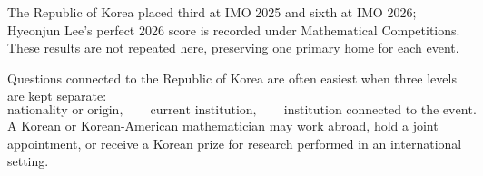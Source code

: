     \begin{fact}
        The Republic of Korea placed third at IMO 2025 and sixth at IMO 2026;
        Hyeonjun Lee's perfect 2026 score is recorded under Mathematical
        Competitions. These results are not repeated here, preserving one primary home for
        each event.
    \end{fact}

    \begin{strategy}
        Questions connected to the Republic of Korea are often easiest when three levels are kept
        separate:
        \[
            \text{nationality or origin},\qquad
            \text{current institution},\qquad
            \text{institution connected to the event}.
        \]
        A Korean or Korean-American mathematician may work abroad, hold a joint
        appointment, or receive a Korean prize for research performed in an
        international setting.
    \end{strategy}

